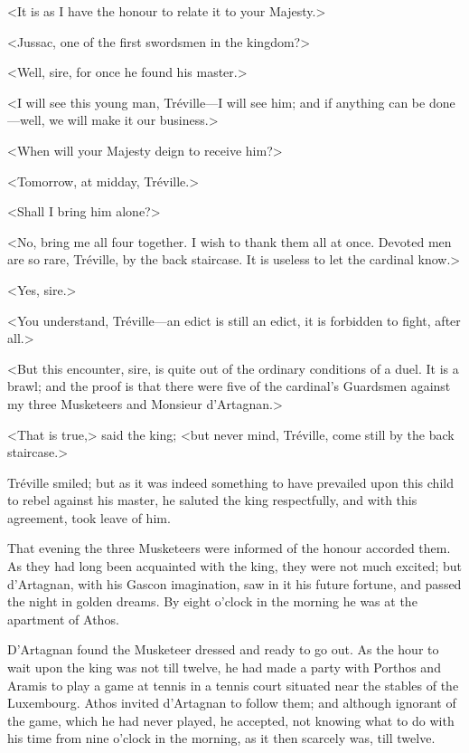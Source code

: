 <It is as I have the honour to relate it to your Majesty.> 

<Jussac, one of the first swordsmen in the kingdom?> 

<Well, sire, for once he found his master.> 

<I will see this young man, Tréville---I will see him; and if anything can be done---well, we will make it our business.> 

<When will your Majesty deign to receive him?> 

<Tomorrow, at midday, Tréville.> 

<Shall I bring him alone?> 

<No, bring me all four together. I wish to thank them all at once. Devoted men are so rare, Tréville, by the back staircase. It is useless to let the cardinal know.> 

<Yes, sire.> 

<You understand, Tréville---an edict is still an edict, it is forbidden to fight, after all.> 

<But this encounter, sire, is quite out of the ordinary conditions of a duel. It is a brawl; and the proof is that there were five of the cardinal's Guardsmen against my three Musketeers and Monsieur d'Artagnan.> 

<That is true,> said the king; <but never mind, Tréville, come still by the back staircase.> 

Tréville smiled; but as it was indeed something to have prevailed upon this child to rebel against his master, he saluted the king respectfully, and with this agreement, took leave of him. 

That evening the three Musketeers were informed of the honour accorded them. As they had long been acquainted with the king, they were not much excited; but d'Artagnan, with his Gascon imagination, saw in it his future fortune, and passed the night in golden dreams. By eight o'clock in the morning he was at the apartment of Athos. 

D'Artagnan found the Musketeer dressed and ready to go out. As the hour to wait upon the king was not till twelve, he had made a party with Porthos and Aramis to play a game at tennis in a tennis court situated near the stables of the Luxembourg. Athos invited d'Artagnan to follow them; and although ignorant of the game, which he had never played, he accepted, not knowing what to do with his time from nine o'clock in the morning, as it then scarcely was, till twelve. 

